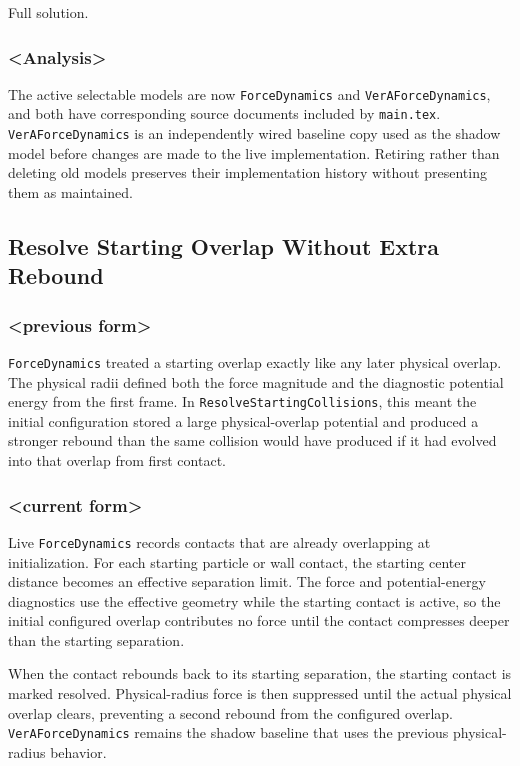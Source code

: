Full solution.

\subsubsection{<Analysis>}

The active selectable models are now \texttt{ForceDynamics} and
\texttt{VerAForceDynamics}, and both have corresponding source documents
included by \texttt{main.tex}.  \texttt{VerAForceDynamics} is an independently
wired baseline copy used as the shadow model before changes are made to the
live implementation.  Retiring rather than deleting old models preserves
their implementation history without presenting them as maintained.

\subsection{Resolve Starting Overlap Without Extra Rebound}

\subsubsection{<previous form>}

\texttt{ForceDynamics} treated a starting overlap exactly like any later
physical overlap.  The physical radii defined both the force magnitude and the
diagnostic potential energy from the first frame.  In
\texttt{ResolveStartingCollisions}, this meant the initial configuration
stored a large physical-overlap potential and produced a stronger rebound than
the same collision would have produced if it had evolved into that overlap
from first contact.

\subsubsection{<current form>}

Live \texttt{ForceDynamics} records contacts that are already overlapping at
initialization.  For each starting particle or wall contact, the starting
center distance becomes an effective separation limit.  The force and
potential-energy diagnostics use the effective geometry while the starting
contact is active, so the initial configured overlap contributes no force
until the contact compresses deeper than the starting separation.

When the contact rebounds back to its starting separation, the starting contact
is marked resolved.  Physical-radius force is then suppressed until the actual
physical overlap clears, preventing a second rebound from the configured
overlap.  \texttt{VerAForceDynamics} remains the shadow baseline that uses the
previous physical-radius behavior.

